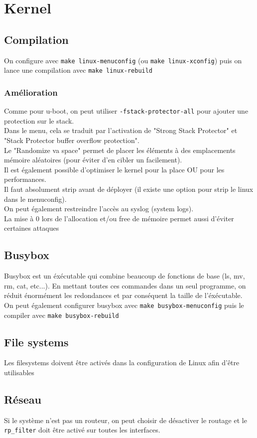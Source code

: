 \section{Kernel}
\subsection{Compilation}
On configure avec \verb!make linux-menuconfig! (ou \verb!make linux-xconfig!) puis on lance une compilation avec \verb!make linux-rebuild!
\subsubsection{Amélioration}
Comme pour u-boot, on peut utiliser \verb!-fstack-protector-all! pour ajouter une protection sur le stack.\\
Dans le menu, cela se traduit par l'activation de "Strong Stack Protector" et "Stack Protector buffer overflow protection".\\
Le "Randomize va space" permet de placer les éléments à des emplacements mémoire aléatoires (pour éviter d'en cibler un facilement).\\
Il est également possible d'optimiser le kernel pour la place OU pour les performances.\\
Il faut absolument strip avant de déployer (il existe une option pour strip le linux dans le menuconfig).\\
On peut également restreindre l'accès au syslog (system logs).\\
La mise à 0 lors de l'allocation et/ou free de mémoire permet aussi d'éviter certaines attaques
\subsection{Busybox}
Busybox est un éxécutable qui combine beaucoup de fonctions de base (ls, mv, rm, cat, etc...). En mettant toutes ces commandes dans un seul programme, on réduit énormément les redondances et par conséquent la taille de l'éxécutable.\\
On peut également configurer busybox avec \verb!make busybox-menuconfig! puis le compiler avec \verb!make busybox-rebuild!
\subsection{File systems}
Les filesystems doivent être activés dans la configuration de Linux afin d'être utilisables
\subsection{Réseau}
Si le système n'est pas un routeur, on peut choisir de désactiver le routage et le \verb!rp_filter! doit être activé sur toutes les interfaces.

